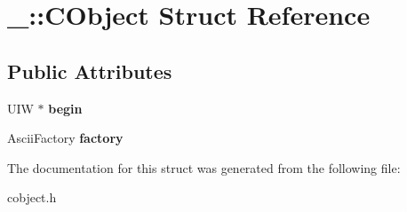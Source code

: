 \hypertarget{struct___1_1_c_object}{}\section{\+\_\+\+:\+:C\+Object Struct Reference}
\label{struct___1_1_c_object}
\subsection*{Public Attributes}
\begin{DoxyCompactItemize}
\item 
\mbox{\label{struct___1_1_c_object_a247735495ff4a9594627296db63e95d6}} 
U\+IW $\ast$ {\bfseries begin}
\item 
\mbox{\label{struct___1_1_c_object_aa29f5ba995fd7a2d5626391d7718041c}} 
Ascii\+Factory {\bfseries factory}
\end{DoxyCompactItemize}


The documentation for this struct was generated from the following file\+:\begin{DoxyCompactItemize}
\item 
cobject.\+h\end{DoxyCompactItemize}
